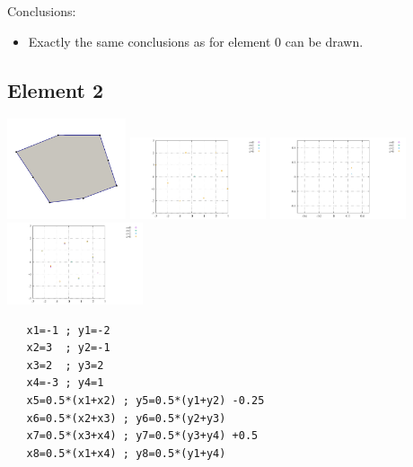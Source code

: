 

Conclusions:
\begin{itemize}
\item Exactly the same conclusions as for element 0 can be drawn.
\end{itemize} 




\newpage
\subsection*{Element 2}
\begin{center}
\includegraphics[width=3.5cm]{images/mappings/biquadratic3/elt2/element2}
\includegraphics[width=4cm]{images/mappings/biquadratic3/elt2/nodes}
\includegraphics[width=4cm]{images/mappings/biquadratic3/elt2/nodes_zoom}
\includegraphics[width=4cm]{images/mappings/biquadratic3/elt2/quad_points}
\end{center}
\begin{lstlisting}
   x1=-1 ; y1=-2
   x2=3  ; y2=-1
   x3=2  ; y3=2
   x4=-3 ; y4=1
   x5=0.5*(x1+x2) ; y5=0.5*(y1+y2) -0.25
   x6=0.5*(x2+x3) ; y6=0.5*(y2+y3)
   x7=0.5*(x3+x4) ; y7=0.5*(y3+y4) +0.5
   x8=0.5*(x1+x4) ; y8=0.5*(y1+y4)
\end{lstlisting}

